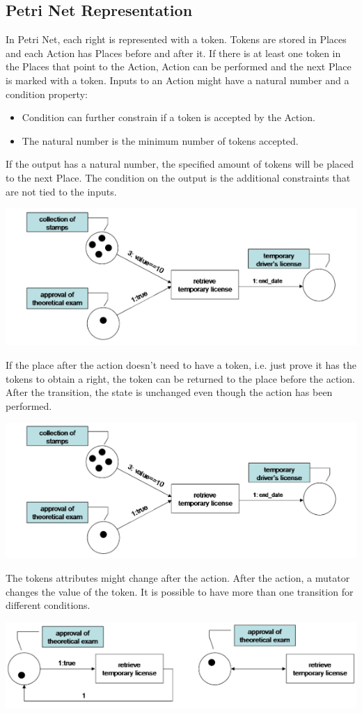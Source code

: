 \documentclass[11pt]{article} %
\begin{document}
\subsection{Petri Net Representation}

In Petri Net, each right is represented with a token.
Tokens are stored in Places and each Action has Places before and after it.
If there is at least one token in the Places that point to the Action, Action can be performed and the next Place is marked with a token.
Inputs to an Action might have a natural number and a condition property:
\begin{itemize}
\item Condition can further constrain if a token is accepted by the Action.
\item The natural number is the minimum number of tokens accepted.
\end{itemize}
If the output has a natural number, the specified amount of tokens will be placed to the next Place.
The condition on the output is the additional constraints that are not tied to the inputs. 

\includegraphics[width=\textwidth]{petri}

If the place after the action doesn't need to have a token, i.e. just prove it has the tokens to obtain a right, the token can be returned to the place before the action.
After the transition, the state is unchanged even though the action has been performed.

\includegraphics[width=\textwidth]{petri2}

The tokens attributes might change after the action. After the action, a mutator changes the value of the token. It is possible to have more than one transition for different conditions.

\includegraphics[width=\textwidth]{petri3}
\end{document}
